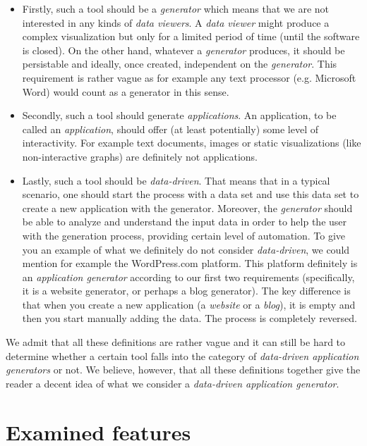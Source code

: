 \begin{itemize}
\item Firstly, such a tool should be a \emph{generator} which means that we are not interested in any kinds of \emph{data viewers}. A \emph{data viewer} might produce a complex visualization but only for a limited period of time (until the software is closed). On the other hand, whatever a \emph{generator} produces, it should be persistable and ideally, once created, independent on the \emph{generator}. This requirement is rather vague as for example any text processor (e.g. Microsoft Word) would count as a generator in this sense. 
\item Secondly, such a tool should generate \emph{applications}. An application, to be called an \emph{application}, should offer (at least potentially) some level of interactivity. For example text documents, images or static visualizations (like non-interactive graphs) are definitely not applications.
\item Lastly, such a tool should be \emph{data-driven}. That means that in a typical scenario, one should start the process with a data set and use this data set to create a new application with the generator.  Moreover, the \emph{generator} should be able to analyze and understand the input data in order to help the user with the generation process, providing certain level of automation. To give you an example of what we definitely do not consider \emph{data-driven}, we could mention for example the WordPress.com \cite{wordpress} platform. This platform definitely is an \emph{application generator} according to our first two requirements (specifically, it is a website generator, or perhaps a blog generator). The key difference is that when you create a new application (a \emph{website} or a \emph{blog}), it is empty and then you start manually adding the data. The process is completely reversed.
\end{itemize}

We admit that all these definitions are rather vague and it can still be hard to determine whether a certain tool falls into the category of \emph{data-driven application generators} or not. We believe, however, that all these definitions together give the reader a decent idea of what we consider a \emph{data-driven application generator}.

\section{Examined features}
\label{sec:rw:features}

